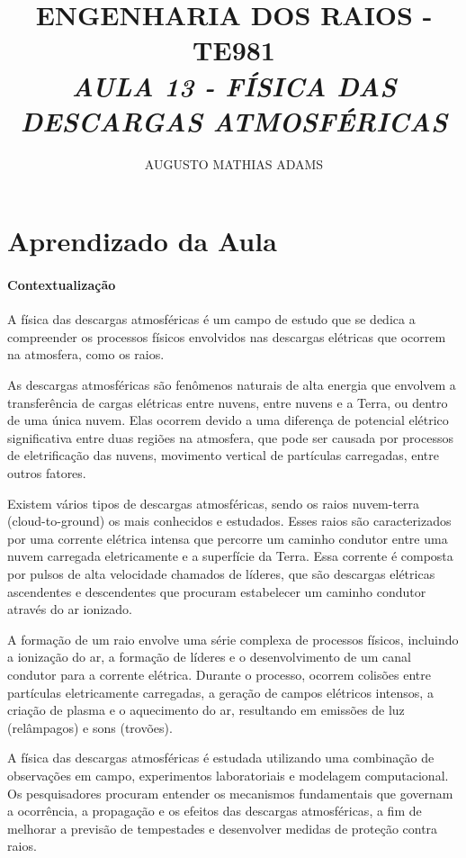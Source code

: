 \documentclass[a4paper, 12pt, onecolumn,singlespacing]{article}
\title{\normalsize{ENGENHARIA DOS RAIOS - TE981}\\ \huge{\textbf\textit{{AULA 13 - FÍSICA DAS DESCARGAS ATMOSFÉRICAS}}\\}}
\author{\small{AUGUSTO MATHIAS ADAMS}}
\begin{document}
	
	\maketitle
	
	\section{Aprendizado da Aula}
	
	\paragraph{Contextualização} A física das descargas atmosféricas é um campo de estudo que se dedica a compreender os processos físicos envolvidos nas descargas elétricas que ocorrem na atmosfera, como os raios.
	
	As descargas atmosféricas são fenômenos naturais de alta energia que envolvem a transferência de cargas elétricas entre nuvens, entre nuvens e a Terra, ou dentro de uma única nuvem. Elas ocorrem devido a uma diferença de potencial elétrico significativa entre duas regiões na atmosfera, que pode ser causada por processos de eletrificação das nuvens, movimento vertical de partículas carregadas, entre outros fatores.
	
	Existem vários tipos de descargas atmosféricas, sendo os raios nuvem-terra (cloud-to-ground) os mais conhecidos e estudados. Esses raios são caracterizados por uma corrente elétrica intensa que percorre um caminho condutor entre uma nuvem carregada eletricamente e a superfície da Terra. Essa corrente é composta por pulsos de alta velocidade chamados de líderes, que são descargas elétricas ascendentes e descendentes que procuram estabelecer um caminho condutor através do ar ionizado.
	
	A formação de um raio envolve uma série complexa de processos físicos, incluindo a ionização do ar, a formação de líderes e o desenvolvimento de um canal condutor para a corrente elétrica. Durante o processo, ocorrem colisões entre partículas eletricamente carregadas, a geração de campos elétricos intensos, a criação de plasma e o aquecimento do ar, resultando em emissões de luz (relâmpagos) e sons (trovões).
	
	A física das descargas atmosféricas é estudada utilizando uma combinação de observações em campo, experimentos laboratoriais e modelagem computacional. Os pesquisadores procuram entender os mecanismos fundamentais que governam a ocorrência, a propagação e os efeitos das descargas atmosféricas, a fim de melhorar a previsão de tempestades e desenvolver medidas de proteção contra raios.
	
\end{document}
